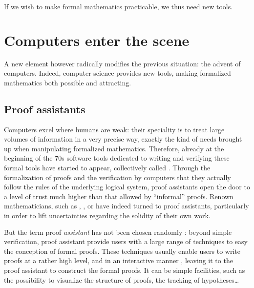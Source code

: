 If we wish to make formal mathematics practicable, we thus need new tools.

\section{Computers enter the scene}
\label{sec:proof-assistants}

A new element however radically modifies the previous situation: the advent of computers.
Indeed, computer science provides new tools, making formalized mathematics both possible
and attracting.

\subsection{Proof assistants}

Computers excel where humans are weak: their speciality is to treat large volumes of
information in a very precise way, exactly the kind of needs brought up when manipulating
formalized mathematics. Therefore, already at the beginning of the 70s%
software tools dedicated to writing and verifying these formal tools have started to
appear, collectively called .
Through the formalization of proofs and the verification by computers that they
actually follow the rules of the underlying logical system, proof assistants open the
door to a level of trust much higher than that allowed by “informal” proofs.
Renown mathematicians, such as ,
, or  have indeed
turned to proof assistants, particularly in order to lift uncertainties regarding the
solidity of their own work.

But the term proof \emph{assistant} has not been chosen randomly : beyond simple verification,
proof assistant provide users with a large range of techniques to easy the conception of
formal proofs. These techniques usually enable users to write proofs at a rather
high level, and in an interactive manner%
,
leaving it to the proof assistant to construct the formal proofs.
It can be simple facilities, such as the possibility to visualize the structure of proofs,
the tracking of hypotheses…

